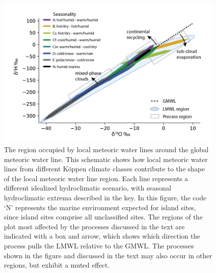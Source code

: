 \documentclass[draft, linenumbers]{agujournal2018}
\begin{document}
\begin{figure}
  \includegraphics[width=6in]{Figs/Fig5.png}
  \caption{The region occupied by local meteoric water lines around the global meteoric water line. This schematic shows how local meteoric water lines from different K{\"o}ppen climate classes contribute to the shape of the local meteoric water line region. Each line represents a different idealized hydroclimatic scenario, with seasonal hydroclimatic extrema described in the key. In this figure, the code `N' represents the marine environment expected for island sites, since island sites comprise all unclassified sites. The regions of the plot most affected by the processes discussed in the text are indicated with a box and arrow, which shows which direction the process pulls the LMWL relative to the GMWL. The processes shown in the figure and discussed in the text may also occur in other regions, but exhibit a muted effect. }
  \label{fig:LMWLschematic}
\end{figure}
\end{document}
